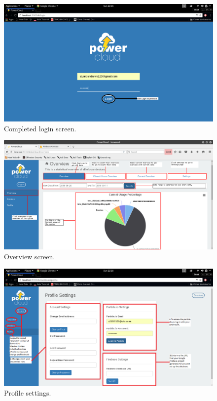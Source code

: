 \documentclass[a4paper,10pt]{article}
\begin{document}
	\begin{figure}[H]
		\includegraphics[width=\textwidth]{images/login2.png}
		\caption{Completed login screen. \label{overflow}}
	\end{figure}
	
	\begin{figure}[H]
		\includegraphics[width=\textwidth]{images/Overview.png}
		\caption{Overview screen. \label{overflow}}
	\end{figure}
	
	\begin{figure}[H]
		\includegraphics[width=\textwidth]{images/profile.png}
		\caption{Profile settings. \label{overflow}}
	\end{figure}
	
\end{document}
